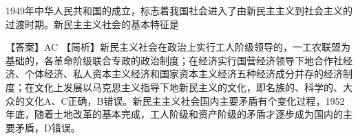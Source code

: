 \question 1949年中华人民共和国的成立，标志着我国社会进入了由新民主主义到社会主义的过渡时期。新民主主义社会的基本特征是
\par{}
\begin{solution}【答案】AC
【简析】新民主义社会在政治上实行工人阶级领导的，一工农联盟为基础的，各革命阶级联合专政的政治制度；在经济实行国营经济领导下地合作社经济、个体经济、私人资本主义经济和国家资本主义经济五种经济成分并存的经济制度；在文化上发展以马克思主义指导下地新民主义的文化，即名族的、科学的、大众的文化A、C正确，B错误。新民主主义社会国内主要矛盾有个变化过程，1952年底，随着土地改革的基本完成，工人阶级和资产阶级的矛盾才逐步成为国内的主要矛盾，D错误。
\end{solution}
